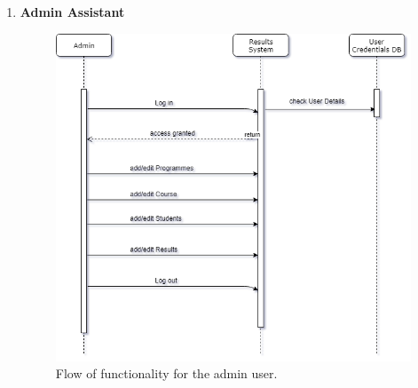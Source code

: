 \begin{enumerate}
\item \textbf{Admin Assistant}
\begin{figure}[H]
\caption{Flow of functionality for the admin user.}
\includegraphics[scale=0.5]{images/SequenceAdmin.png}
\end{figure}


\end{enumerate}

